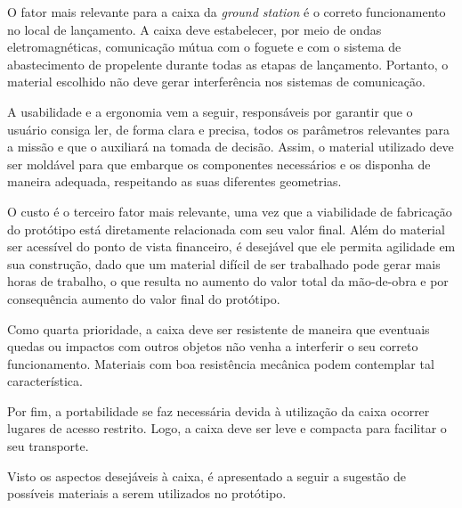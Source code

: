 \par O fator mais relevante para a caixa da \textit{ground station} é o correto funcionamento no local de lançamento. A caixa deve estabelecer, por meio de ondas eletromagnéticas, comunicação mútua com o foguete e com o sistema de abastecimento de propelente durante todas as etapas de lançamento. Portanto, o material escolhido não deve gerar interferência nos sistemas de comunicação. 

\par A usabilidade e a ergonomia vem a seguir, responsáveis por garantir que o usuário consiga ler, de forma clara e precisa, todos os parâmetros relevantes para a missão e que o auxiliará na tomada de decisão. Assim, o material utilizado deve ser moldável para que embarque os componentes necessários e os disponha de maneira adequada, respeitando as suas diferentes geometrias.

\par O custo é o terceiro fator mais relevante, uma vez que a viabilidade de fabricação do protótipo está diretamente relacionada com seu valor final. Além do material ser acessível do ponto de vista financeiro, é desejável que ele permita agilidade em sua construção, dado que um material difícil de ser trabalhado pode gerar mais horas de trabalho, o que resulta no aumento do valor total da mão-de-obra e por consequência aumento do valor final do protótipo.

\par Como quarta prioridade, a caixa deve ser resistente de maneira que eventuais quedas ou impactos com outros objetos não venha a interferir o seu correto funcionamento. Materiais com boa resistência mecânica podem contemplar tal característica. 

\par Por fim, a portabilidade se faz necessária devida à utilização da caixa ocorrer lugares de acesso restrito. Logo, a caixa deve ser leve e compacta para facilitar o seu transporte.

\par Visto os aspectos desejáveis à caixa, é apresentado a seguir a sugestão de possíveis materiais a serem utilizados no protótipo.

